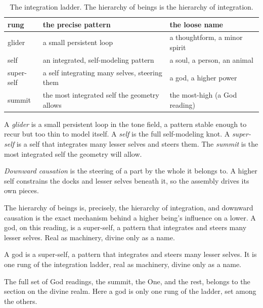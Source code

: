 \begin{table}[ht]
\centering
\begin{tabular}{@{}lll@{}}
\toprule
rung & the precise pattern & the loose name \\
\midrule
glider & a small persistent loop & a thoughtform, a minor spirit \\
self & an integrated, self-modeling pattern & a soul, a person, an animal \\
super-self & a self integrating many selves, steering them & a god, a higher power \\
summit & the most integrated self the geometry allows & the most-high (a God reading) \\
\bottomrule
\end{tabular}
\caption{The integration ladder. The hierarchy of beings is the hierarchy of integration.}
\label{tab:being-ladder}
\end{table}

A \emph{glider} is a small persistent loop in the tone field, a pattern stable enough to recur but too thin to model itself. A \emph{self} is the full self-modeling knot. A \emph{super-self} is a self that integrates many lesser selves and steers them. The \emph{summit} is the most integrated self the geometry will allow.

\begin{definition}
\emph{Downward causation} is the steering of a part by the whole it belongs to. A higher self constrains the docks and lesser selves beneath it, so the assembly drives its own pieces.
\end{definition}

The hierarchy of beings is, precisely, the hierarchy of integration, and downward causation is the exact mechanism behind a higher being's influence on a lower. A god, on this reading, is a super-self, a pattern that integrates and steers many lesser selves. Real as machinery, divine only as a name.

\begin{principle}
A god is a super-self, a pattern that integrates and steers many lesser selves. It is one rung of the integration ladder, real as machinery, divine only as a name.
\end{principle}

The full set of God readings, the summit, the One, and the rest, belongs to the section on the divine realm. Here a god is only one rung of the ladder, set among the others.

